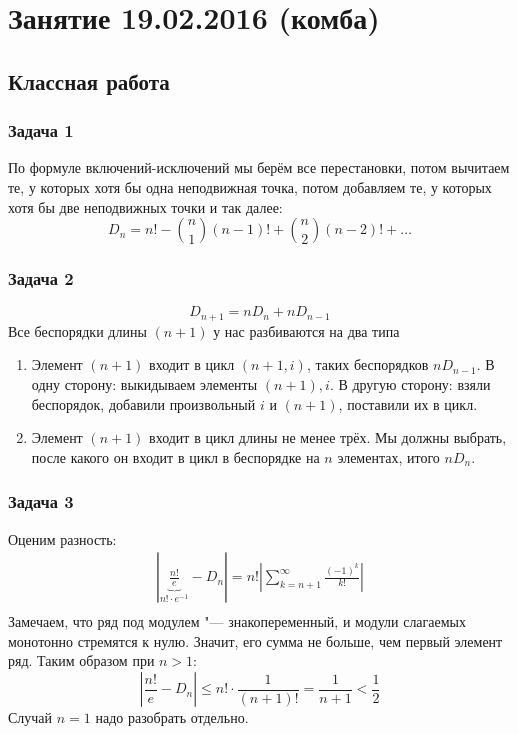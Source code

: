 \chapter{Занятие 19.02.2016 (комба)}
\section{Классная работа}
\subsection{Задача 1}
	По формуле включений-исключений мы берём все перестановки,
	потом вычитаем те, у которых хотя бы одна неподвижная точка,
	потом добавляем те, у которых хотя бы две неподвижных точки и так далее:
	\[ D_n = n! - \binom{n}{1}(n-1)! + \binom{n}{2}(n-2)! + \dots \]

\subsection{Задача 2}
	\[ D_{n+1} = nD_n + nD_{n-1} \]
	Все беспорядки длины $(n+1)$ у нас разбиваются на два типа
	\begin{enumerate}
		\item
			Элемент $(n+1)$ входит в цикл $(n+1, i)$, таких беспорядков $nD_{n-1}$.
			В одну сторону: выкидываем элементы $(n+1), i$.
			В другую сторону: взяли беспорядок, добавили произвольный $i$ и $(n+1)$,
			поставили их в цикл.
		\item 
			Элемент $(n+1)$ входит в цикл длины не менее трёх.
			Мы должны выбрать, после какого он входит в цикл в беспорядке на $n$ элементах,
			итого $nD_n$.
	\end{enumerate}

\subsection{Задача 3}
	Оценим разность:
	\begin{gather*}
		\left|\underbrace{\frac{n!}{e}}_{n!\cdot e^{-1}} - D_n\right| =
		n!\left|\sum_{k=n+1}^\infty \frac{(-1)^k}{k!}\right| \\
	\end{gather*}
	Замечаем, что ряд под модулем "--- знакопеременный, и модули слагаемых монотонно стремятся к нулю.
	Значит, его сумма не больше, чем первый элемент ряд.
	Таким образом при $n>1$:
	\[
		\left|\frac{n!}{e} - D_n\right| \le n! \cdot \frac{1}{(n+1)!} = \frac{1}{n+1} < \frac 1 2
	\]
	Случай $n=1$ надо разобрать отдельно.

